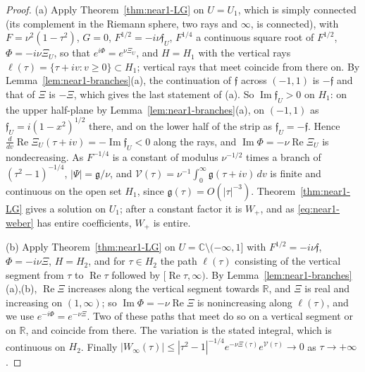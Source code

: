 \documentclass[11pt]{amsart}
\theoremstyle{definition}
\theoremstyle{remark}
\numberwithin{equation}{section}
\newcommand{\C}{\mathbb{C}}
\newcommand{\R}{\mathbb{R}}
\DeclareMathOperator{\re}{Re}
\DeclareMathOperator{\im}{Im}
\begin{document}
\begin{proof}
(a) Apply Theorem~\ref{thm:near1-LG} on $U=U_1$, which is simply connected (its complement in the Riemann sphere, two rays and $\infty$, is connected), with $F=\nu^2(1-\tau^2)$, $G=0$, $F^{1/2}=-i\nu\mathfrak f_U$, $F^{1/4}$ a continuous square root of $F^{1/2}$, $\Phi=-i\nu\Xi_U$, so that $e^{i\Phi}=e^{\nu\Xi_U}$, and $H=H_1$ with the vertical rays $\ell(\tau)=\{\tau+iv:v\ge0\}\subset H_1$; vertical rays that meet coincide from there on. By Lemma~\ref{lem:near1-branches}(a), the continuation of $\mathfrak f$ across $(-1,1)$ is $-\mathfrak f$ and that of $\Xi$ is $-\Xi$, which gives the last statement of (a). So $\im\mathfrak f_U>0$ on $H_1$: on the upper half-plane by Lemma~\ref{lem:near1-branches}(a), on $(-1,1)$ as $\mathfrak f_U=i(1-x^2)^{1/2}$ there, and on the lower half of the strip as $\mathfrak f_U=-\mathfrak f$. Hence $\frac d{dv}\re\Xi_U(\tau+iv)=-\im\mathfrak f_U<0$ along the rays, and $\im\Phi=-\nu\re\Xi_U$ is nondecreasing. As $F^{-1/4}$ is a constant of modulus $\nu^{-1/2}$ times a branch of $(\tau^2-1)^{-1/4}$, $|\Psi|=\mathfrak g/\nu$, and $\mathcal V(\tau)=\nu^{-1}\int_0^\infty\mathfrak g(\tau+iv)\,dv$ is finite and continuous on the open set $H_1$, since $\mathfrak g(\tau)=O(|\tau|^{-3})$. Theorem~\ref{thm:near1-LG} gives a solution on $U_1$; after a constant factor it is $W_+$, and as \eqref{eq:near1-weber} has entire coefficients, $W_+$ is entire.

(b) Apply Theorem~\ref{thm:near1-LG} on $U=\C\setminus(-\infty,1]$ with $F^{1/2}=-i\nu\mathfrak f$, $\Phi=-i\nu\Xi$, $H=H_2$, and for $\tau\in H_2$ the path $\ell(\tau)$ consisting of the vertical segment from $\tau$ to $\re\tau$ followed by $[\re\tau,\infty)$. By Lemma~\ref{lem:near1-branches}(a),(b), $\re\Xi$ increases along the vertical segment towards $\R$, and $\Xi$ is real and increasing on $(1,\infty)$; so $\im\Phi=-\nu\re\Xi$ is nonincreasing along $\ell(\tau)$, and we use $e^{-i\Phi}=e^{-\nu\Xi}$. Two of these paths that meet do so on a vertical segment or on $\R$, and coincide from there. The variation is the stated integral, which is continuous on $H_2$. Finally $|W_\infty(\tau)|\le|\tau^2-1|^{-1/4}e^{-\nu\Xi(\tau)}e^{\mathcal V(\tau)}\to0$ as $\tau\to+\infty$.
\end{proof}
\end{document}
